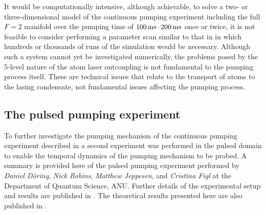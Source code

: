 It would be computationally intensive, although achievable, to solve a two- or three-dimensional model of the continuous pumping experiment including the full $F=2$ manifold over the pumping time of $\unit[100]{ms}$--$\unit[200]{ms}$ once or twice, it is not feasible to consider performing a parameter scan similar to that in  in which hundreds or thousands of runs of the simulation would be necessary.  Although such a system cannot yet be investigated numerically, the problems posed by the 5-level nature of the atom laser outcoupling is not fundamental to the pumping process itself.  These are technical issues that relate to the transport of atoms to the lasing condensate, not fundamental issues affecting the pumping process.


\subsection{The pulsed pumping experiment}
\label{OpticalPumping:PulsedPumpingExperiment}

To further investigate the pumping mechanism of the continuous pumping experiment described in  a second experiment was performed in the pulsed domain to enable the temporal dynamics of the pumping mechanism to be probed.  A summary is provided here of the pulsed pumping experiment performed by \emph{Daniel Döring}, \emph{Nick Robins}, \emph{Matthew Jeppesen}, and \emph{Cristina Figl} at the Department of Quantum Science, ANU.  Further details of the experimental setup and results are published in \citep{Doring:2009}.  The theoretical results presented here are also published in \citep{Doring:2009}.

\parasep

